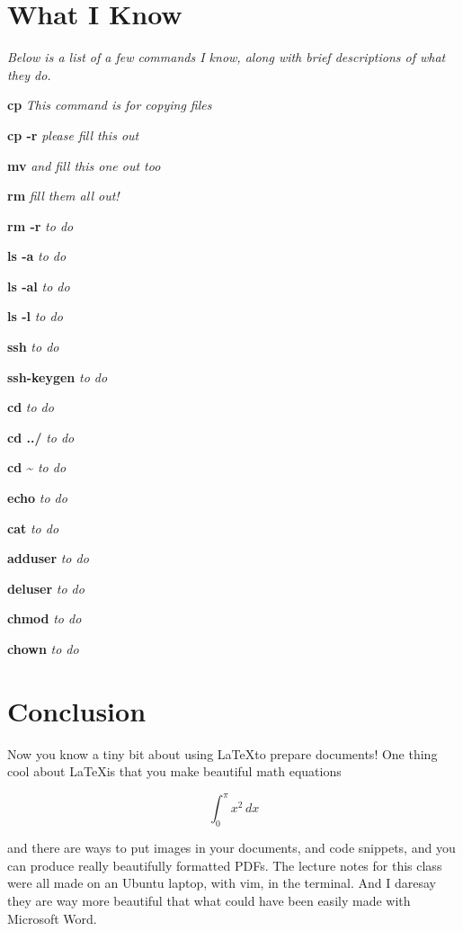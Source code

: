 \documentclass[11pt]{article}
\newcommand{\iknow}[2]{\par\textbf{#1} \textit{#2}}
\begin{document}
\section*{What I Know}

\noindent\textit{Below is a list of a few commands I know, along with brief descriptions of what they do.}
\iknow{cp}{This command is for copying files}
\iknow{cp -r}{please fill this out}
\iknow{mv}{and fill this one out too}
\iknow{rm}{fill them all out!}
\iknow{rm -r}{to do}
\iknow{ls -a}{to do}
\iknow{ls -al}{to do}
\iknow{ls -l}{to do}
\iknow{ssh}{to do}
\iknow{ssh-keygen}{to do}
\iknow{cd}{to do}
\iknow{cd ../}{to do}
\iknow{cd \textasciitilde}{to do}
\iknow{echo}{to do}
\iknow{cat}{to do}
\iknow{adduser}{to do}
\iknow{deluser}{to do}
\iknow{chmod}{to do}
\iknow{chown}{to do}

\section*{Conclusion}
Now you know a tiny bit about using \LaTeX to prepare documents! One thing cool about \LaTeX is that you make beautiful math equations

\begin{equation}
\int_{0}^{\pi}x^2\,dx
\end{equation}

and there are ways to put images in your documents, and code snippets, and you can produce really beautifully formatted PDFs. The lecture notes for this class were all made on an Ubuntu laptop, with vim, in the terminal. And I daresay they are way more beautiful that what could have been easily made with Microsoft Word.
\end{document}
